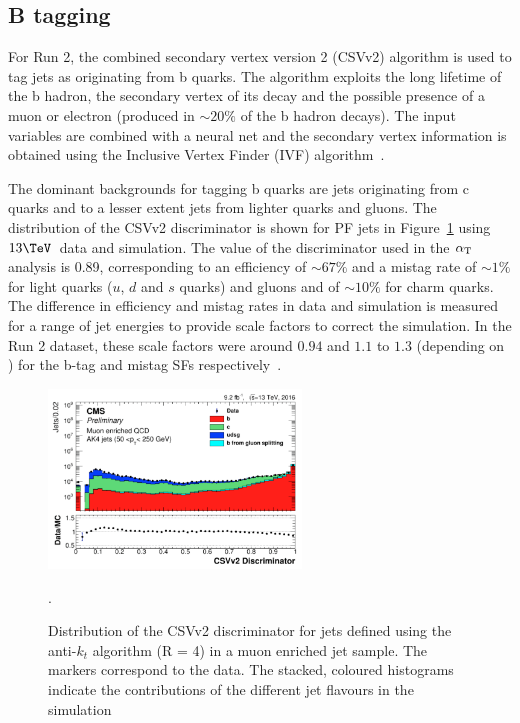 \subsection{B tagging}
\label{sec:btag}
For Run 2, the combined secondary vertex version 2 (CSVv2) algorithm is used to tag jets as originating
from b quarks. The algorithm exploits the long lifetime of the b hadron, the secondary vertex of its decay
and the possible presence of a muon or electron (produced in $\sim 20\%$ of the b hadron decays). The 
input variables are combined with a neural net and the secondary vertex
information is obtained using the Inclusive Vertex Finder (IVF) algorithm~\cite{csv_pas}.

The dominant backgrounds for tagging b quarks are jets originating from c quarks and to a lesser extent
jets from lighter quarks and gluons. The distribution of the CSVv2 discriminator is shown for PF jets
in Figure~\ref{fig:csv_fig} using $13\TeV$~data and simulation. The value of the discriminator
used in the $\alpha_{\text{T}}$ analysis is 0.89, corresponding to an efficiency of $\sim67\%$ and 
a mistag rate of $\sim 1\%$ for light quarks ($u$, $d$ and $s$ quarks) and gluons and of $\sim 10\%$ for
charm quarks. The difference in efficiency and mistag rates in data and simulation is measured 
for a range of jet energies to provide scale factors to correct the simulation. In the
Run 2 dataset, these scale factors were around $0.94$ and $1.1$ to $1.3$ (depending on \pt) for the b-tag and mistag SFs 
respectively~\cite{csv_fig}.

\begin{figure}
\centering
    \includegraphics[width=0.6\textwidth]{./Figures/reconstruction/csv_fig.png}
  \caption{\label{fig:csv_fig} Distribution of the CSVv2 discriminator for jets 
  defined using the anti-$k_t$ algorithm (R = 4) in a muon enriched jet sample. The markers correspond to the data. 
The stacked, coloured histograms indicate the contributions of the different 
jet flavours in the simulation~\cite{csv_fig}}.
\end{figure}
%
%
%
